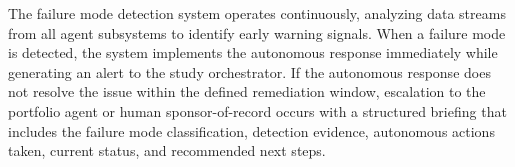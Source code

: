 The failure mode detection system operates continuously, analyzing data streams from all
agent subsystems to identify early warning signals. When a failure mode is detected, the
system implements the autonomous response immediately while generating an alert to the
study orchestrator. If the autonomous response does not resolve the issue within the
defined remediation window, escalation to the portfolio agent or human sponsor-of-record
occurs with a structured briefing that includes the failure mode classification, detection
evidence, autonomous actions taken, current status, and recommended next steps.
